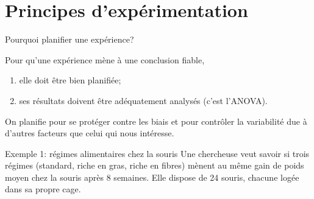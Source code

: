 \documentclass{BeamerTemplate}
\begin{document}
\section{Principes d'expérimentation}

\begin{frame}[t]{Pourquoi planifier une expérience?}

Pour qu'une expérience mène à une conclusion fiable,
\begin{enumerate}
  \item elle doit être \alert{bien planifiée};
  \item ses résultats doivent être \alert{adéquatement analysés} (c'est l'ANOVA).
\end{enumerate}
On planifie pour se protéger contre les \alert{biais} et pour \alert{contrôler la
variabilité} due à d'autres facteurs que celui qui nous intéresse.

\begin{Boite}{Exemple 1: régimes alimentaires chez la souris}
\small
Une chercheuse veut savoir si trois régimes (standard, riche en gras, riche en
fibres) mènent au même \alert{gain de poids} moyen chez la souris après 8 semaines.
Elle dispose de 24 souris, chacune logée dans sa propre cage.
\end{Boite}


\end{frame}
\end{document}
